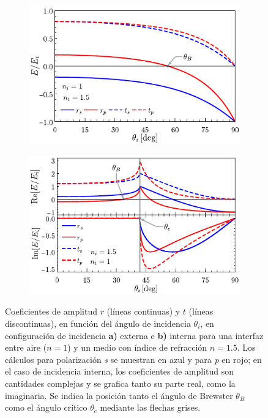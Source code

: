 \begin{figure}[h!]\centering\hspace*{-1.5em}
	\begin{subfigure}{.05\textwidth}\vspace{-4.5cm}\caption{}\label{sfig:coefExt}\end{subfigure}
	\begin{subfigure}{.43\textwidth} \hspace*{-.8cm}
	\includegraphics[scale=1]{1-Teoria/figs/1-1-ampCoefExt}
	\end{subfigure}
	\begin{subfigure}{.05\textwidth}\vspace{-4.5cm}\caption{}\label{sfig:coefInt}\end{subfigure}
	\begin{subfigure}{.43\textwidth} \hspace*{-.9cm}
	\includegraphics[scale=1]{1-Teoria/figs/1-1-ampCoefInt}
	\end{subfigure}\vspace*{-.7em}
	\caption{ Coeficientes de amplitud $r$ (líneas continuas) y $t$ (líneas discontinuas), en función del ángulo de incidencia $\theta_i$, en configuración de incidencia \textbf{a)} externa e \textbf{b)} interna para una interfaz entre  aire ($n=1$) y un medio con índice de refracción $n = 1.5$. Los cálculos para polarización  \emph{s} se muestran  en azul y  para \emph{p} en rojo; en el caso de incidencia interna, los coeficientes de amplitud son cantidades complejas y se grafica tanto su parte real, como la imaginaria. Se indica la posición tanto el ángulo de Brewster $\theta_B$ como el ángulo crítico $\theta_c$ mediante las flechas grises.}	\label{fig:coefAmp}	
	\end{figure}	

